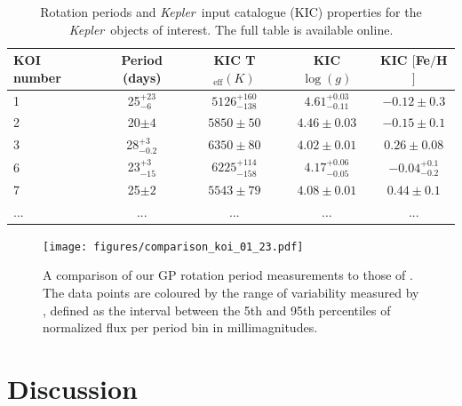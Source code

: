\documentclass[a4paper,fleqn,usenatbib,useAMS]{mnras}
\newcommand{\Kepler}{{\it Kepler}}
\begin{document}
\begin{table}
\begin{center}
    \caption{Rotation periods and \Kepler\ input catalogue (KIC) properties
    for the \Kepler\ objects of interest. The full table is available online.}
\begin{tabular}{lcccc}
    KOI number & Period (days) & KIC T$_{\mathrm{eff}} (K)$ & KIC $\log(g)$ &
    KIC $[$Fe$/$H$]$ \\
    \hline
1 & 25$^{+23}_{-6}$ & $5126^{+160}_{-138}$ & $4.61^{+0.03}_{-0.11}$ & $-0.12\pm0.3$\\
2 & 20$\pm4$ & $5850\pm50$ & $4.46\pm0.03$ & $-0.15\pm0.1$\\
3 & 28$^{+3}_{-0.2}$ & $6350\pm80$ & $4.02\pm0.01$ & $0.26\pm0.08$\\
6 & 23$^{+3}_{-15}$ & $6225^{+114}_{-158}$ & $4.17^{+0.06}_{-0.05}$ & $-0.04^{+0.1}_{-0.2}$\\
7 & 25$\pm2$ & $5543\pm79$ & $4.08\pm0.01$ & $0.44\pm0.1$\\
    ... & ... & ... & ... & ... \\
\end{tabular}
\end{center}
\end{table}
\label{tab:koi_periods}

\begin{figure}
\begin{center}
\texttt{[image: figures/comparison\_koi\_01\_23.pdf]}
\caption[Comparison with McQuillan results.]
{A comparison of our GP rotation period measurements to those of
\citet{Mcquillan2013}.
The data points are coloured by the range of variability measured by
    \citet{Mcquillan2013}, defined as the interval between the 5th and 95th
    percentiles of normalized flux per period bin in millimagnitudes.}
\label{fig:mcquillan}
\end{center}
\end{figure}

\section{Discussion}
\label{sec:discussion}
\end{document}
